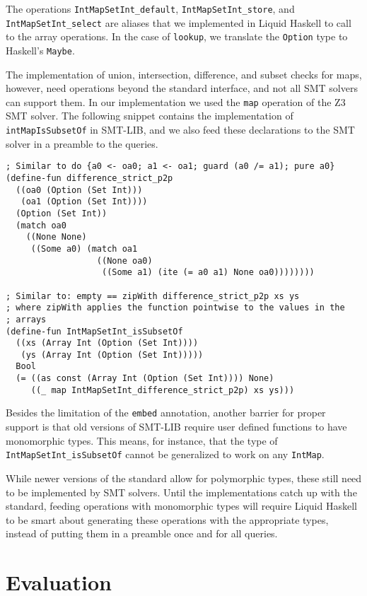\documentclass[sigconf]{acmart}
\newcommand{\tc}[1]{{\small\texttt{#1}}}
\begin{document}
The operations \tc{IntMapSetInt\_default}, \tc{IntMapSetInt\_store}, and \tc{IntMapSetInt\_select}
are aliases that we implemented in Liquid Haskell to call to the array operations.
In the case of \tc{lookup}, we translate the \tc{Option} type to Haskell's \tc{Maybe}.

The implementation of union, intersection,
difference, and subset checks for maps, however,
need operations beyond the standard interface, and not all SMT solvers can support
them. In our implementation we used the \tc{map} operation of the
Z3 SMT solver. The following snippet contains the implementation of
\tc{intMapIsSubsetOf} in SMT-LIB, and we also feed these declarations to the
SMT solver in a preamble to the queries.

\begin{verbatim}
; Similar to do {a0 <- oa0; a1 <- oa1; guard (a0 /= a1); pure a0}
(define-fun difference_strict_p2p
  ((oa0 (Option (Set Int)))
   (oa1 (Option (Set Int))))
  (Option (Set Int))
  (match oa0
    ((None None)
     ((Some a0) (match oa1
                  ((None oa0)
                   ((Some a1) (ite (= a0 a1) None oa0))))))))

; Similar to: empty == zipWith difference_strict_p2p xs ys
; where zipWith applies the function pointwise to the values in the
; arrays
(define-fun IntMapSetInt_isSubsetOf
  ((xs (Array Int (Option (Set Int))))
   (ys (Array Int (Option (Set Int)))))
  Bool
  (= ((as const (Array Int (Option (Set Int)))) None)
     ((_ map IntMapSetInt_difference_strict_p2p) xs ys)))
\end{verbatim}

Besides the limitation of the \tc{embed} annotation, another barrier for
proper support is that old versions of SMT-LIB require user defined
functions to have monomorphic types. This means, for instance, that
the type of \tc{IntMapSetInt\_isSubsetOf} cannot be generalized to work
on any \tc{IntMap}.

While newer versions of the standard allow
for polymorphic types, these still need to be implemented by SMT solvers.
Until the implementations catch up with the standard, feeding operations with
monomorphic types will require Liquid Haskell to be smart about generating
these operations with the appropriate types, instead of putting them in a
preamble once and for all queries.


\section{Evaluation}
\label{evaluation}
\end{document}
